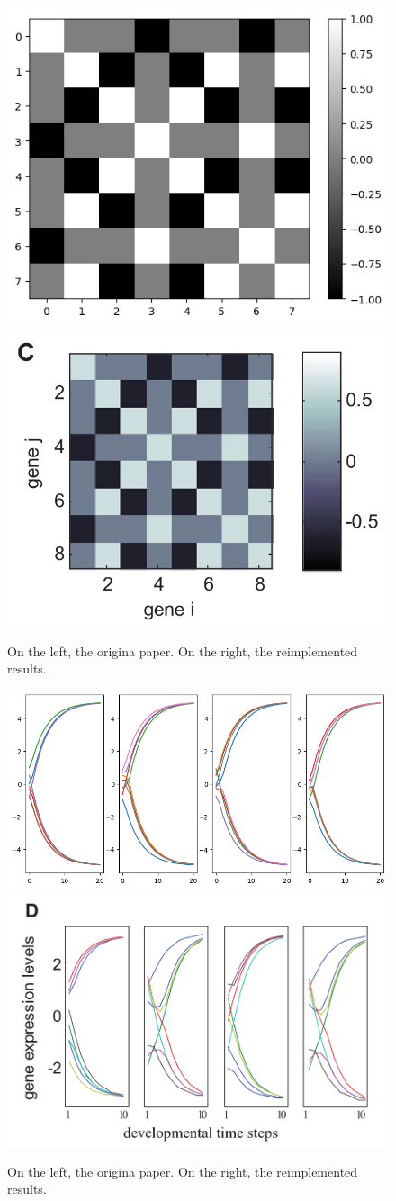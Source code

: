 \documentclass[twocolumn,a4paper]{article}
\begin{document}
    \begin{figure}[h]
        \includegraphics[width=0.48\linewidth]{img/fig2c.png}
        \includegraphics[width=0.48\linewidth]{orig_img/fig2c.png}
        \caption{On the left, the origina paper. On the right, the reimplemented results.}
    \end{figure}

    \begin{figure}[h]
        \includegraphics[width=0.9\linewidth]{img/fig2d.png}
        \includegraphics[width=0.9\linewidth]{orig_img/fig2d.png}
        \caption{On the left, the origina paper. On the right, the reimplemented results.}
    \end{figure}
\end{document}
